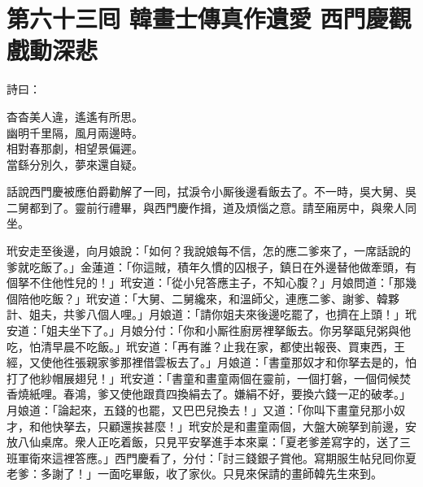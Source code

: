
\chapter*{第六十三囘 韓畫士傳真作遺愛 西門慶觀戲動深悲}


詩曰：

\begin{myquote} 
杳杳美人違，遙遙有所思。\\幽明千里隔，風月兩邊時。\\相對春那劇，相望景偏遲。\\當繇分別久，夢來還自疑。
\end{myquote} 

話說西門慶被應伯爵勸解了一囘，拭淚令小厮後邊看飯去了。不一時，吳大舅、吳二舅都到了。靈前行禮畢，與西門慶作揖，道及煩惱之意。請至廂房中，與衆人同坐。

玳安走至後邊，向月娘說：「如何？我說娘每不信，怎的應二爹來了，一席話說的爹就吃飯了。」金蓮道：「你這賊，積年久慣的囚根子，鎮日在外邊替他做牽頭，有個拏不住他性兒的！」玳安道：「從小兒答應主子，不知心腹？」月娘問道：「那幾個陪他吃飯？」玳安道：「大舅、二舅纔來，和溫師父，連應二爹、謝爹、韓夥計、姐夫，共爹八個人哩。」月娘道：「請你姐夫來後邊吃罷了，也擠在上頭！」玳安道：「姐夫坐下了。」月娘分付：「你和小厮徃廚房裡拏飯去。你另拏甌兒粥與他吃，怕清早晨不吃飯。」玳安道：「再有誰？止我在家，都使出報䘮、買東西，王經，又使他徃張親家爹那裡借雲板去了。」月娘道：「書童那奴才和你拏去是的，怕打了他紗帽展翅兒！」玳安道：「書童和畫童兩個在靈前，一個打磐，一個伺候焚香燒紙哩。春鴻，爹又使他跟賁四換絹去了。嫌絹不好，要換六錢一疋的破孝。」月娘道：「論起來，五錢的也罷，又巴巴兒換去！」又道：「你叫下畫童兒那小奴才，和他快拏去，只顧還挨甚麼！」玳安於是和畫童兩個，大盤大碗拏到前邊，安放八仙桌席。衆人正吃着飯，只見平安拏進手本來稟：「夏老爹差寫字的，送了三班軍衛來這裡答應。」西門慶看了，分付：「討三錢銀子賞他。寫期服生帖兒囘你夏老爹：多謝了！」一面吃畢飯，收了家伙。只見來保請的畫師韓先生來到。

